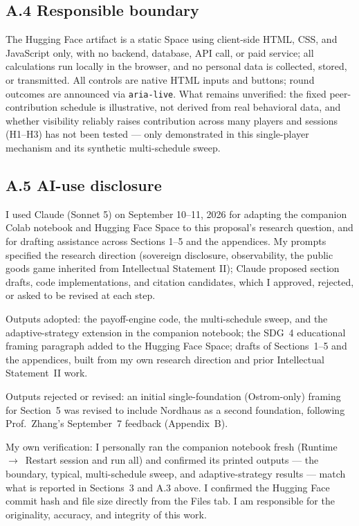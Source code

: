 \subsection*{A.4 Responsible boundary}
The Hugging Face artifact is a static Space using client-side HTML, CSS, and JavaScript only, with no backend, database, API call, or paid service; all calculations run locally in the browser, and no personal data is collected, stored, or transmitted. All controls are native HTML inputs and buttons; round outcomes are announced via \texttt{aria-live}. What remains unverified: the fixed peer-contribution schedule is illustrative, not derived from real behavioral data, and whether visibility reliably raises contribution across many players and sessions (H1--H3) has not been tested --- only demonstrated in this single-player mechanism and its synthetic multi-schedule sweep.

\subsection*{A.5 AI-use disclosure}
I used Claude (Sonnet 5) on September 10--11, 2026 for adapting the companion Colab notebook and Hugging Face Space to this proposal's research question, and for drafting assistance across Sections 1--5 and the appendices. My prompts specified the research direction (sovereign disclosure, observability, the public goods game inherited from Intellectual Statement II); Claude proposed section drafts, code implementations, and citation candidates, which I approved, rejected, or asked to be revised at each step.

Outputs adopted: the payoff-engine code, the multi-schedule sweep, and the adaptive-strategy extension in the companion notebook; the SDG~4 educational framing paragraph added to the Hugging Face Space; drafts of Sections~1--5 and the appendices, built from my own research direction and prior Intellectual Statement~II work.

Outputs rejected or revised: an initial single-foundation (Ostrom-only) framing for Section~5 was revised to include Nordhaus as a second foundation, following Prof.\ Zhang's September~7 feedback (Appendix~B).

My own verification: I personally ran the companion notebook fresh (Runtime~$\to$~Restart session and run all) and confirmed its printed outputs --- the boundary, typical, multi-schedule sweep, and adaptive-strategy results --- match what is reported in Sections~3 and A.3 above. I confirmed the Hugging Face commit hash and file size directly from the Files tab. I am responsible for the originality, accuracy, and integrity of this work.

